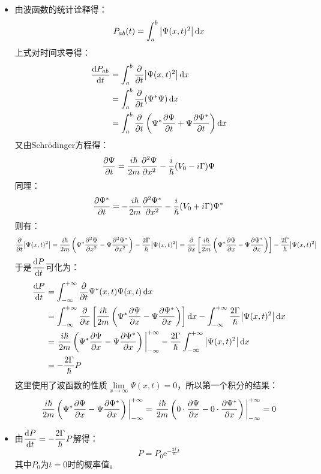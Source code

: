 \documentclass[a4paper,fontset=none]{ctexart}
\renewcommand\hbar\hslash
\begin{document}
\begin{itemize}
        \bigskip
        \item[17.(a)]
        由波函数的统计诠释得：
        \[
            P_{ab}(t) = \int_a^b \abs{\Psi(x,t)^2} \dd{x}
        \]
        上式对时间求导得：
        \begin{align*}
            \dv{P_{ab}}{t}
            &= \int_a^b \pdv{t} \abs{\Psi(x,t)^2} \dd{x} \\
            &= \int_a^b \pdv{t} (\Psi^* \Psi) \dd{x} \\
            &= \int_a^b \pdv{t} \left(\Psi^* \pdv{\Psi}{t} + \Psi \pdv{\Psi^*}{t}\right) \dd{x}
        \end{align*}
        又由Schrödinger方程得：
        \[
            \pdv{\Psi}{t} = \frac{i\hbar}{2m} \pdv[2]{\Psi}{x} - \frac{i}{\hbar}(V_0 - i\Gamma)\Psi
        \]
        同理：
        \[
            \pdv{\Psi^*}{t} = -\frac{i\hbar}{2m} \pdv[2]{\Psi^*}{x} - \frac{i}{\hbar}(V_0 + i\Gamma)\Psi^*
        \]
        则有：
        \[
            \pdv{t}\abs{\Psi(x,t)^2}
            = \frac{i\hbar}{2m} \left(\Psi^* \pdv[2]{\Psi}{x} - \Psi \pdv[2]{\Psi^*}{x}\right) - \frac{2\Gamma}{\hbar}\abs{\Psi(x,t)^2}
            = \pdv{x} \left[\frac{i\hbar}{2m} \left(\Psi^* \pdv{\Psi}{x} - \Psi \pdv{\Psi^*}{x}\right)\right] - \frac{2\Gamma}{\hbar}\abs{\Psi(x,t)^2}
        \]
        于是$\displaystyle \dv{P}{t}$可化为：
        \begin{align*}
            \dv{P}{t}
            &= \int_{-\infty}^{+\infty} \pdv{t} \Psi^*(x,t) \Psi(x,t) \dd{x} \\
            &= \int_{-\infty}^{+\infty} \pdv{x} \left[\frac{i\hbar}{2m} \left(\Psi^* \pdv{\Psi}{x} - \Psi \pdv{\Psi^*}{x}\right)\right] \dd{x} - \int_{-\infty}^{+\infty} \frac{2\Gamma}{\hbar}\abs{\Psi(x,t)^2} \dd{x}\\
            &= \eval{\frac{i\hbar}{2m} \left(\Psi^* \pdv{\Psi}{x} - \Psi \pdv{\Psi^*}{x}\right)}_{-\infty}^{+\infty} - \frac{2\Gamma}{\hbar} \int_{-\infty}^{+\infty} \abs{\Psi(x,t)^2} \dd{x} \\
            &= -\frac{2\Gamma}{\hbar} P
        \end{align*}
        这里使用了波函数的性质$\lim\limits_{x \to \infty} \Psi(x,t) = 0$，所以第一个积分的结果：
        \[
            \eval{\frac{i\hbar}{2m} \left(\Psi^* \pdv{\Psi}{x} - \Psi \pdv{\Psi^*}{x}\right)}_{-\infty}^{+\infty}
            = \eval{\frac{i\hbar}{2m} \left(0 \cdot \pdv{\Psi}{x} - 0 \cdot \pdv{\Psi^*}{x}\right)}_{-\infty}^{+\infty}
            = 0
        \]

        \item[17.(b)]
        由$\displaystyle \dv{P}{t} = -\frac{2\Gamma}{\hbar} P$解得：
        \[
            P = P_0 \mathrm{e}^{-\tfrac{2\Gamma}{\hbar} t}
        \]
        其中$P_0$为$t = 0$时的概率值。


\end{itemize}
\end{document}
